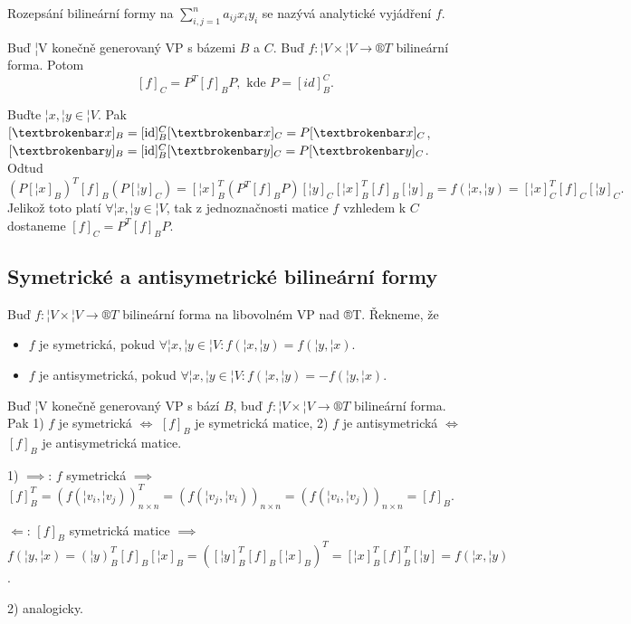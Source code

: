 \documentclass[12pt]{article}                   %
\begin{document}
        \begin{poznamka}[Terminologie]
            Rozepsání bilineární formy na $\sum_{i, j = 1}^n a_{ij}x_iy_i$ se nazývá analytické vyjádření $f$.
        \end{poznamka}

        \begin{tvrzeni}
            Buď ¦V konečně generovaný VP s bázemi $B$ a $C$. Buď $f: ¦V \times ¦V \rightarrow ®T$ bilineární forma. Potom
            $$ [f]_C = P^T [f]_B P, \text{ kde } P = [id]_B^C. $$ 

            \begin{dukazin}
                Buďte $¦x, ¦y \in ¦V$. Pak $[¦x]_B = [\id]^C_B [¦x]_C = P[¦x]_C$, $[¦y]_B = [\id]_B^C [¦y]_C = P[¦y]_C$. Odtud
                $$ (P[¦x]_B)^T [f]_B (P[¦y]_C) = [¦x]_B^T (P^T [f]_B P)[¦y]_C [¦x]_B^T [f]_B [¦y]_B = f(¦x, ¦y) = [¦x]_C^T[f]_C[¦y]_C. $$ 
                Jelikož toto platí $\forall ¦x, ¦y \in ¦V$, tak z jednoznačnosti matice $f$ vzhledem k $C$ dostaneme $[f]_C = P^T [f]_B P$.
            \end{dukazin}
        \end{tvrzeni}

    \subsection{Symetrické a antisymetrické bilineární formy}
        \begin{definice}
            Buď $f: ¦V \times ¦V \rightarrow ®T$ bilineární forma na libovolném VP nad ®T. Řekneme, že
            
            \begin{itemize}
                \item $f$ je symetrická, pokud $\forall ¦x, ¦y \in ¦V: f(¦x, ¦y) = f(¦y, ¦x)$.
                \item $f$ je antisymetrická, pokud $\forall ¦x, ¦y \in ¦V: f(¦x, ¦y) = -f(¦y, ¦x)$.
            \end{itemize}
        \end{definice}

        \begin{tvrzeni}
            Buď ¦V konečně generovaný VP s bází $B$, buď $f: ¦V \times ¦V \rightarrow ®T$ bilineární forma. Pak 1) $f$ je symetrická $\Leftrightarrow$ $[f]_B$ je symetrická matice, 2) $f$ je antisymetrická $\Leftrightarrow$ $[f]_B$ je antisymetrická matice.

            \begin{dukazin}
                1) $\implies$: $f$ symetrická $\implies$ $[f]_B^T = (f(¦v_i, ¦v_j))^T_{n\times n} = (f(¦v_j, ¦v_i))_{n \times n} = (f(¦v_i, ¦v_j))_{n \times n} = [f]_B$.

                $\Leftarrow$: $[f]_B$ symetrická matice $\implies$ $f(¦y, ¦x) = (¦y)^T_B [f]_B [¦x]_B = ([¦y]_B^T [f]_B [¦x]_B)^T = [¦x]_B^T [f]_B^T [¦y] = f(¦x, ¦y)$.

                2) analogicky.
            \end{dukazin}
        \end{tvrzeni}
\end{document}
